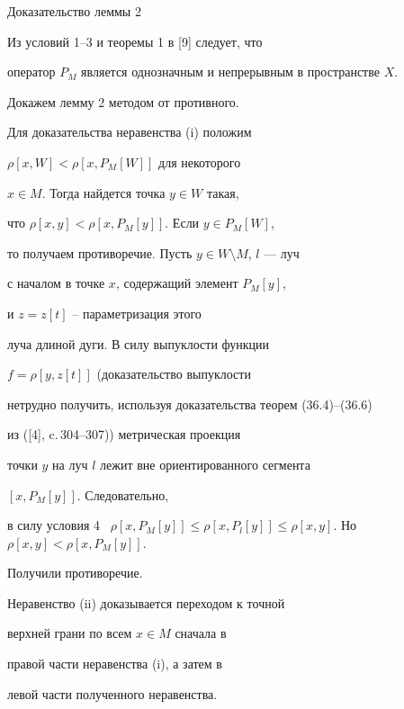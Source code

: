 \begin{pf*}{Доказательство леммы 2}


Из условий 1--3 и теоремы 1 в [9] следует, что 


оператор $P_{M}$ является однозначным и непрерывным в пространстве $X$.


Докажем лемму 2 методом от противного. 





Для доказательства неравенства (i) положим


$\rho [x,W] < \rho [x,P_{M}[W]]$ для некоторого


$x \in M$. Тогда найдется точка $y \in W$ такая,


что $\rho [x,y] < \rho [x,P_{M}[y]]$. Если $y \in P_{M}[W]$, 


то получаем противоречие. Пусть $y \in W \setminus M$, $l$ --- луч


с началом в точке $x$, содержащий элемент $P_{M}[y]$,


и $z = z[t]$ -- параметризация этого


луча длиной дуги. В силу выпуклости функции


$f = \rho[y,z[t]]$ (доказательство выпуклости


нетрудно получить, используя доказательства теорем (36.4)--(36.6)


из ([4], c.\,304--307)) метрическая проекция 


точки $y$ на луч $l$ лежит вне ориентированного сегмента 


$[x,P_{M}[y]]$. Следовательно,


в силу условия 4 \ $\rho [x,P_{M}[y]] \leq \rho [x,P_{l}[y]]


\leq \rho [x,y]$. Но $\rho [x,y] < \rho [x,P_{M}[y]]$.


Получили противоречие. 





Неравенство (ii) доказывается переходом к точной 


верхней грани по всем $x \in M$ сначала в 


правой части неравенства (i), а затем в 


левой части полученного неравенства.


\end{pf*}









